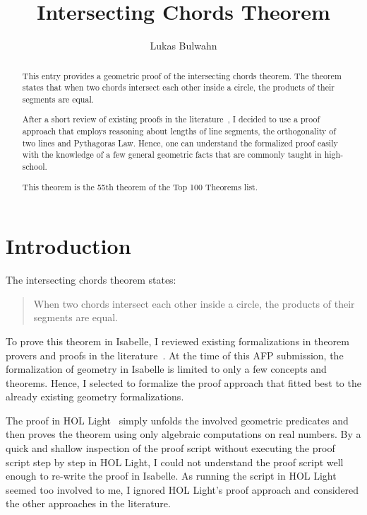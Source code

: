 \documentclass[11pt,a4paper]{article}
\begin{document}
\title{Intersecting Chords Theorem}
\author{Lukas Bulwahn}
\maketitle

\begin{abstract}

This entry provides a geometric proof of the intersecting chords theorem.
The theorem states that when two chords intersect each other inside a circle,
the products of their segments are equal.

After a short review of existing proofs in the
literature~\cite{proofwiki:chord-theorem, knorr-1989, birkhoff-beatley-1959, harrison},
I decided to use a proof approach that employs reasoning about
lengths of line segments, the orthogonality of two lines and
Pythagoras Law. Hence, one can understand the formalized
proof easily with the knowledge of a few general geometric facts
that are commonly taught in high-school.

This theorem is the 55th theorem of the Top 100 Theorems list.
\end{abstract}

\tableofcontents

\section{Introduction}
The intersecting chords theorem states:
\begin{quote}
When two chords intersect each other inside a circle, the products of their segments are equal.
\end{quote}
To prove this theorem in Isabelle, I reviewed existing formalizations in theorem provers
and proofs in the literature~\cite{proofwiki:chord-theorem, knorr-1989, birkhoff-beatley-1959, harrison}.
At the time of this AFP submission, the formalization of geometry in Isabelle
is limited to only a few concepts and theorems. Hence, I selected to formalize
the proof approach that fitted best to the already existing geometry formalizations.

The proof in HOL Light~\cite{harrison} simply unfolds the involved geometric predicates and then
proves the theorem using only algebraic computations on real numbers. By a quick and
shallow inspection of the proof script without executing the proof script step by step in
HOL Light, I could not understand the proof script well enough to re-write the proof
in Isabelle. As running the script in HOL Light seemed too involved to me, I
ignored HOL Light's proof approach and considered the other approaches in the literature.
\end{document}
